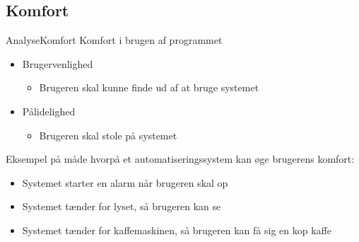 \subsection{Komfort}
\begin{frame}{Analyse}{Komfort}
Komfort i brugen af programmet
\begin{itemize}
\item Brugervenlighed
\begin{itemize}
\item Brugeren skal kunne finde ud af at bruge systemet
\end{itemize}
\item Pålidelighed
\begin{itemize}
\item Brugeren skal stole på systemet
\end{itemize}
\end{itemize}
Eksempel på måde hvorpå et automatiseringssystem kan øge brugerens komfort:
\begin{itemize}
\item Systemet starter en alarm når brugeren skal op
\item Systemet tænder for lyset, så brugeren kan se
\item Systemet tænder for kaffemaskinen, så brugeren kan få sig en kop kaffe
\end{itemize}
\end{frame}